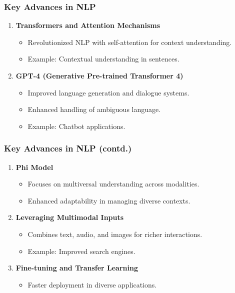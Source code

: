 \documentclass[aspectratio=169]{beamer}
\begin{document}
\begin{frame}
    \frametitle{Key Advances in NLP}
    \begin{enumerate}
        \item \textbf{Transformers and Attention Mechanisms}
            \begin{itemize}
                \item Revolutionized NLP with self-attention for context understanding.
                \item Example: Contextual understanding in sentences.
            \end{itemize}
        \item \textbf{GPT-4 (Generative Pre-trained Transformer 4)}
            \begin{itemize}
                \item Improved language generation and dialogue systems.
                \item Enhanced handling of ambiguous language.
                \item Example: Chatbot applications.
            \end{itemize}
    \end{enumerate}
\end{frame}

\begin{frame}
    \frametitle{Key Advances in NLP (contd.)}
    \begin{enumerate}
        \item \textbf{Phi Model}
            \begin{itemize}
                \item Focuses on multiversal understanding across modalities.
                \item Enhanced adaptability in managing diverse contexts.
            \end{itemize}
        \item \textbf{Leveraging Multimodal Inputs}
            \begin{itemize}
                \item Combines text, audio, and images for richer interactions.
                \item Example: Improved search engines.
            \end{itemize}
        \item \textbf{Fine-tuning and Transfer Learning}
            \begin{itemize}
                \item Faster deployment in diverse applications.
            \end{itemize}
    \end{enumerate}
\end{frame}
\end{document}
